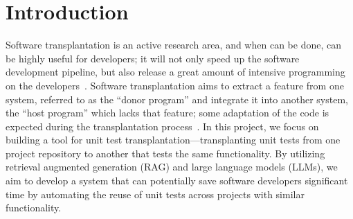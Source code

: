 \documentclass[sigconf]{acmart}
\begin{document}
\section{Introduction}
%
Software transplantation is an active research area, and when can be done, can be highly useful for developers; it will not only speed up the software development pipeline, but also release a great amount of intensive programming on the developers~\cite{alshahwan2023_softwaretestingchallenges,barr2015_automatedsoftwaretransplantation, sodhi2021_an_insight_on_software_features_supporting_transplantation__a_systematic_review}.
%
Software transplantation aims to extract a feature from one system, referred to as the ``donor program'' and integrate it into another system, the ``host program'' which lacks that feature; some adaptation of the code is expected during the transplantation process~\cite{barr2015_automatedsoftwaretransplantation, sodhi2021_an_insight_on_software_features_supporting_transplantation__a_systematic_review}.
%
In this project, we focus on building a tool for unit test transplantation—transplanting unit tests from one project repository to another that tests the same functionality.
%
By utilizing retrieval augmented generation (RAG) and large language models (LLMs), we aim to develop a system that can potentially save software developers significant time by automating the reuse of unit tests across projects with similar functionality.





\end{document}
